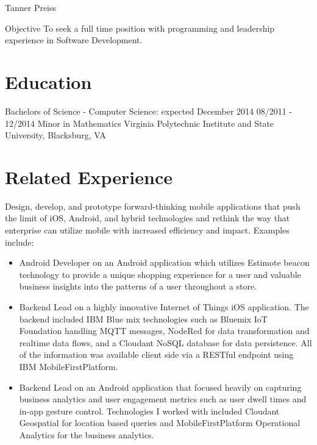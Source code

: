 \documentclass{tpreiss_cv}
\begin{document}
Tanner Preiss



Objective   To seek a full time position with programming and leadership experience in Software Development.

\section{Education}
Bachelors of Science - Computer Science: expected December 2014 	                                 08/2011 - 12/2014
Minor in Mathematics
Virginia Polytechnic Institute and State University, Blacksburg, VA


\section{Related Experience}


Design, develop, and prototype forward-thinking mobile applications that push the limit of iOS, Android, and hybrid technologies and rethink the way that enterprise can utilize mobile with increased efficiency and impact.
Examples include:
\begin{itemize}
\item Android Developer on an Android application which utilizes Estimote beacon technology to provide a unique shopping experience for a user and valuable business insights into the patterns of a user throughout a store.
\item Backend Lead on a highly innovative Internet of Things iOS application. The backend included IBM Blue
mix technologies such as Bluemix IoT Foundation handling MQTT messages, NodeRed for data transformation and realtime data flows, and a Cloudant NoSQL database for data persistence. All of the information was available client side via a RESTful endpoint using IBM MobileFirstPlatform.  
\item Backend Lead on an Android application that focused heavily on capturing business analytics and user engagement metrics such as user dwell times and in-app gesture control. Technologies I worked with included Cloudant Geospatial for location based queries and MobileFirstPlatform Operational Analytics for the business analytics.
\end{itemize}
\end{document}

